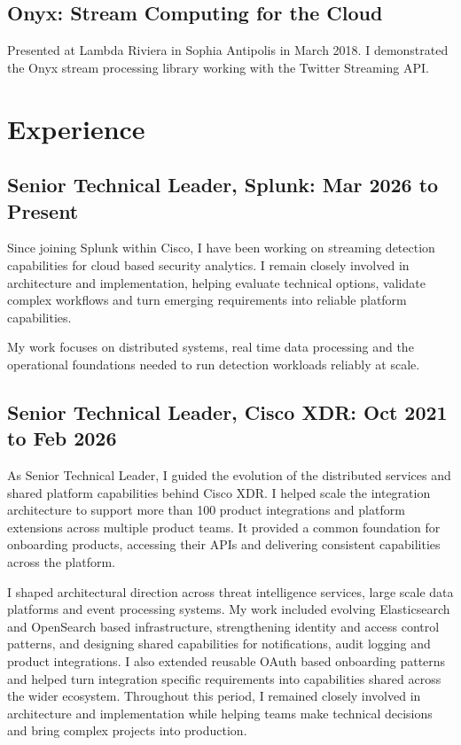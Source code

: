 \documentclass{article}
\begin{document}
\subsection*{Onyx: Stream Computing for the Cloud}
Presented at Lambda Riviera in Sophia Antipolis in March 2018. I demonstrated the Onyx stream processing library working with the Twitter Streaming API.

\section*{Experience}
\subsection*{Senior Technical Leader, Splunk: Mar 2026 to Present}
Since joining Splunk within Cisco, I have been working on streaming detection capabilities for cloud based security analytics. I remain closely involved in architecture and implementation, helping evaluate technical options, validate complex workflows and turn emerging requirements into reliable platform capabilities.

My work focuses on distributed systems, real time data processing and the operational foundations needed to run detection workloads reliably at scale.

\subsection*{Senior Technical Leader, Cisco XDR: Oct 2021 to Feb 2026}
As Senior Technical Leader, I guided the evolution of the distributed services and shared platform capabilities behind Cisco XDR. I helped scale the integration architecture to support more than 100 product integrations and platform extensions across multiple product teams. It provided a common foundation for onboarding products, accessing their APIs and delivering consistent capabilities across the platform.

I shaped architectural direction across threat intelligence services, large scale data platforms and event processing systems. My work included evolving Elasticsearch and OpenSearch based infrastructure, strengthening identity and access control patterns, and designing shared capabilities for notifications, audit logging and product integrations. I also extended reusable OAuth based onboarding patterns and helped turn integration specific requirements into capabilities shared across the wider ecosystem. Throughout this period, I remained closely involved in architecture and implementation while helping teams make technical decisions and bring complex projects into production.
\end{document}
